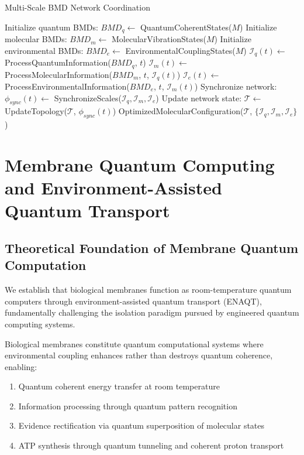\documentclass[11pt,a4paper]{article}
\begin{document}
\begin{algorithm}
\caption{Multi-Scale BMD Network Coordination}
\begin{algorithmic}
    \State Initialize quantum BMDs: $BMD_q \leftarrow$ QuantumCoherentStates($M$)
    \State Initialize molecular BMDs: $BMD_m \leftarrow$ MolecularVibrationStates($M$)
    \State Initialize environmental BMDs: $BMD_e \leftarrow$ EnvironmentalCouplingStates($M$)
        \State $\mathcal{I}_q(t) \leftarrow$ ProcessQuantumInformation($BMD_q$, $t$)
        \State $\mathcal{I}_m(t) \leftarrow$ ProcessMolecularInformation($BMD_m$, $t$, $\mathcal{I}_q(t)$)
        \State $\mathcal{I}_e(t) \leftarrow$ ProcessEnvironmentalInformation($BMD_e$, $t$, $\mathcal{I}_m(t)$)
        \State Synchronize network: $\phi_{sync}(t) \leftarrow$ SynchronizeScales($\mathcal{I}_q, \mathcal{I}_m, \mathcal{I}_e$)
        \State Update network state: $\mathcal{T} \leftarrow$ UpdateTopology($\mathcal{T}$, $\phi_{sync}(t)$)
    \EndFor
    \State \Return OptimizedMolecularConfiguration($\mathcal{T}$, $\{\mathcal{I}_q, \mathcal{I}_m, \mathcal{I}_e\}$)
\EndProcedure
\end{algorithmic}
\end{algorithm}

\section{Membrane Quantum Computing and Environment-Assisted Quantum Transport}

\subsection{Theoretical Foundation of Membrane Quantum Computation}

We establish that biological membranes function as room-temperature quantum computers through environment-assisted quantum transport (ENAQT), fundamentally challenging the isolation paradigm pursued by engineered quantum computing systems.

\begin{theorem}
Biological membranes constitute quantum computational systems where environmental coupling enhances rather than destroys quantum coherence, enabling:
\begin{enumerate}
\item Quantum coherent energy transfer at room temperature
\item Information processing through quantum pattern recognition
\item Evidence rectification via quantum superposition of molecular states
\item ATP synthesis through quantum tunneling and coherent proton transport
\end{enumerate}
\end{theorem}
\end{document}
